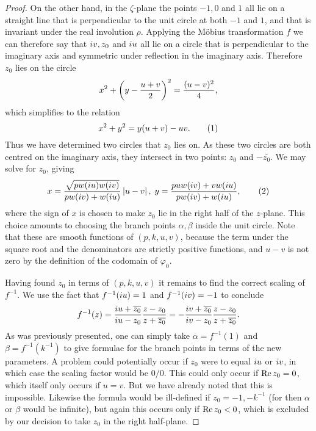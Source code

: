 \begin{lem}
\begin{proof}
On the other hand, in the $ζ$-plane the points $-1,0$ and $1$ all lie on a straight line that is perpendicular to the unit circle at both $-1$ and $1$, and that is invariant under the real involution $ρ$. Applying the Möbius transformation $f$ we can therefore say that $i v, z_0$ and $i u$ all lie on a circle that is perpendicular to the imaginary axis and symmetric under reflection in the imaginary axis. Therefore $z_0$ lies on the circle
\[
x^2 + \left( y - \frac{u+v}{2} \right)^2 = \frac{(u-v)^2}{4},
\]
which simplifies to the relation
\[
x^2 + y^2 = y(u+v) - uv. \labelthis{eqn:z_0_circle}
\]
Thus we have determined two circles that $z_0$ lies on. As these two circles are both centred on the imaginary axis, they intersect in two points: $z_0$ and $-\bar{z_0}$. We may solve for $z_0$, giving
\[
x = \frac{\sqrt{pw(\iu u)w(\iu v)}}{pw(\iu v) + w(\iu u)} \abs{u-v},\; y = \frac{puw(\iu v) + vw(\iu u)}{pw(\iu v) + w(\iu u)},
\labelthis{eqn:formula xy}
\]
where the sign of $x$ is chosen to make $z_0$ lie in the right half of the $z$-plane. This choice amounts to choosing the branch points $α,β$ inside the unit circle. Note that these are smooth functions of $(p,k,u,v)$, because the term under the square root and the denominators are strictly positive functions, and $u-v$ is not zero by the definition of the codomain of $φ_0$.

Having found $z_0$ in terms of $(p,k,u,v)$ it remains to find the correct scaling of $f^{-1}$. We use the fact that $f^{-1}(i u) = 1$ and $f^{-1}(i v) = -1$ to conclude
\[
f^{-1}(z)
=  \frac{i u + \overline{z_0}}{i u - z_0} \frac{z-z_0}{z + \overline{z_0}}
=  -\frac{i v + \overline{z_0}}{i v - z_0} \frac{z-z_0}{z + \overline{z_0}}.
\]
As was previously presented, one can simply take $α = f^{-1}(1)$ and $β = f^{-1}(k^{-1})$ to give formulae for the branch points in terms of the new parameters. A problem could potentially occur if $z_0$ were to equal $i u$ or $i v$, in which case the scaling factor would be $0/0$. This could only occur if $\operatorname{Re} z_0 = 0$, which itself only occurs if $u=v$. But we have already noted that this is impossible. Likewise the formula would be ill-defined if $z_0 = -1, -k^{-1}$ (for then $α$ or $β$ would be infinite), but again this occurs only if $\operatorname{Re} z_0 < 0$, which is excluded by our decision to take $z_0$ in the right half-plane.


\end{proof}
\end{lem}
